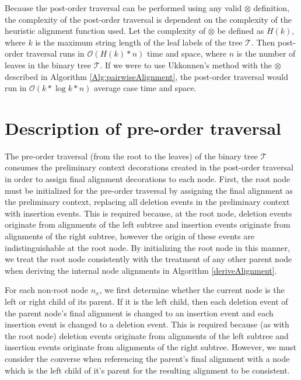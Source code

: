 \documentclass{bmcart}
\begin{document}
Because the post-order traversal can be performed using any valid  $\otimes$ definition, the complexity of the post-order traversal is dependent on the complexity of the heuristic alignment function used.
Let the complexity of $\otimes$ be defined as $H(k)$, where $k$ is the maximum string length of the leaf labels of the tree $\mathcal{T}$.
Then post-order traversal runs in $\mathcal{O}(H(k) * n)$ time and space, where $n$ is the number of leaves in the binary tree $\mathcal{T}$.
If we were to use Ukkonnen's method with the $\otimes$ described in Algorithm \ref{Alg:pairwiseAlignment}, the post-order traversal would run in $\mathcal{O}(k * \log  k * n)$ average case time and space.

\section*{Description of pre-order traversal}
The pre-order traversal (from the root to the leaves) of the binary tree $\mathcal{T}$ consumes the preliminary context decorations created in the post-order traversal in order to assign final alignment decorations to each node.
First, the root node must be initialized for the pre-order traversal by assigning the final alignment as the preliminary context, replacing all deletion events in the preliminary context with insertion events.
This is required because, at the root node, deletion events originate from alignments of the left subtree and insertion events originate from alignments of the right subtree, however the origin of these events are indistinguishable at the root node.
By initializing the root node in this manner, we treat the root node consistently with the treatment of any other parent node when deriving the internal node alignments in Algorithm \ref{deriveAlignment}.

For each non-root node $n_x$, we first determine whether the current node is the left or right child of its parent.
If it is the left child, then each deletion event of the parent node's final alignment is changed to an insertion event and each insertion event is changed to a deletion event.
This is required because (as with the root node) deletion events originate from alignments of the left subtree and insertion events originate from alignments of the right subtree. 
However, we must consider the converse when referencing the parent's final alignment with a node which is the left child of it's parent for the resulting alignment to be consistent.
\end{document}

